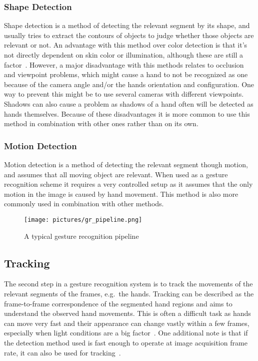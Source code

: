 \subsubsection{Shape Detection} 
Shape detection is a method of detecting the relevant segment by its shape, and usually tries to extract the contours of objects to judge
whether those objects are relevant or not. An advantage with this method over color detection is that it's not directly dependent on skin color or
illumination, although these are still a factor~\citep{Rautaray2015}. However, a major disadvantage with this methods relates to occlusion and viewpoint
problems, which might cause a hand to not be recognized as one because of the camera angle and/or the hands orientation and configuration. One way to prevent this
might be to use several cameras with different viewpoints.
Shadows can also cause a problem as shadows of a hand often will be detected as hands themselves. Because of these disadvantages it is more
common to use this method in combination with other ones rather than on its own.

\subsubsection{Motion Detection} 
Motion detection is a method of detecting the relevant segment though motion, and assumes that all moving object are relevant.
When used as a gesture recognition scheme it requires a very controlled setup as it assumes that the only motion in the image is caused by hand movement. 
This method is also more commonly used in combination with other methods.

\begin{figure}%
	\texttt{[image: pictures/gr\_pipeline.png]}
	\caption[The gesture recognition pipeline]{A typical gesture recognition pipeline~\citep{Pisharady2015} }
	\label{fig:gr_pipeline}
\end{figure}

\subsection{Tracking}
The second step in a gesture recognition system is to track the movements of the relevant segments of the frames, e.g.~the hands. 
Tracking can be described as the frame-to-frame correspondence of the segmented hand regions and aims to understand the observed hand movements. 
This is often a difficult task as hands can move very fast and their appearance can change vastly within a few frames, 
especially when light conditions are a big factor~\citep{Wang2010}. 
One additional note is that if the detection method used is fast enough to operate at image acquisition frame rate, it can also be used for tracking~\citep{Rautaray2015}.   


